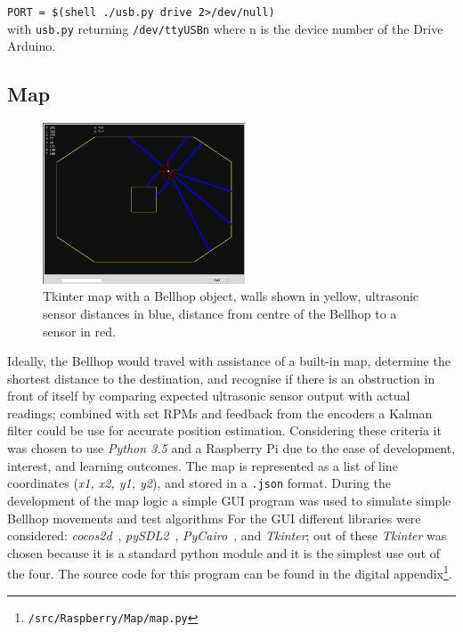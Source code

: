 \documentclass[11pt]{article}
\begin{document}
\texttt{PORT = \$(shell ./usb.py drive 2>/dev/null)}\\
with \texttt{usb.py} returning \texttt{/dev/ttyUSBn} where n is the device number of the Drive Arduino.

\newpage
\subsection*{Map}
\begin{figure}
  \label{GUI}
  \includegraphics[width=6cm]{GUI.png}
  \caption{Tkinter map with a Bellhop object, walls shown in yellow, ultrasonic sensor distances in blue, distance from centre of the Bellhop to a sensor in red.}
\end{figure}
Ideally, the Bellhop would travel with assistance of a built-in map, determine the shortest distance to the destination, and recognise if there is an obstruction in front of itself by comparing expected ultrasonic sensor output with actual readings; combined with set RPMs and feedback from the encoders a Kalman filter could be use for accurate position estimation. Considering these criteria it was chosen to use \textit{Python 3.5} and a Raspberry Pi due to the ease of development, interest, and learning outcomes. The map is represented as a list of line coordinates (\textit{x1, x2, y1, y2}), and stored in a \texttt{.json} format. During the development of the map logic a simple GUI program was used to simulate simple Bellhop movements and test algorithms For the GUI different libraries were considered: \textit{cocos2d}~\cite{cocos2d}, \textit{pySDL2}~\cite{PySDL2}, \textit{PyCairo}~\cite{cairo}, and \textit{Tkinter}; out of these \textit{Tkinter} was chosen because it is a standard python module and it is the simplest use out of the four. The source code for this program can be found in the digital appendix\footnote{\texttt{/src/Raspberry/Map/map.py}}.
\end{document}
